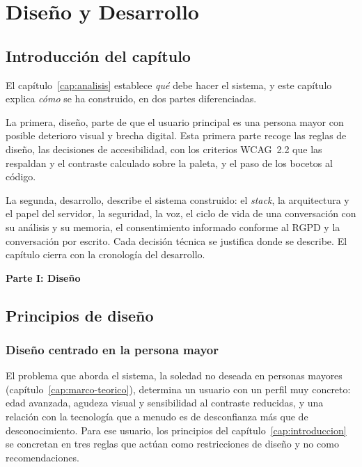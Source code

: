 \chapter{Diseño y Desarrollo}
\label{cap:diseno-desarrollo}

\newcommand{\partesep}[1]{%
  \bigskip
  \begin{center}\hrulefill\quad\textbf{\large #1}\quad\hrulefill\end{center}
  \addcontentsline{toc}{section}{#1}%
  \nopagebreak\medskip}

\section{Introducción del capítulo}

El capítulo~\ref{cap:analisis} establece \emph{qué} debe hacer el sistema, y este capítulo explica \emph{cómo} se ha construido, en dos partes diferenciadas.

La primera, diseño, parte de que el usuario principal es una persona mayor con posible deterioro visual y brecha digital. Esta primera parte recoge las reglas de diseño, las decisiones de accesibilidad, con los criterios WCAG~2.2 que las respaldan y el contraste calculado sobre la paleta, y el paso de los bocetos al código.

La segunda, desarrollo, describe el sistema construido: el \emph{stack}, la arquitectura y el papel del servidor, la seguridad, la voz, el ciclo de vida de una conversación con su análisis y su memoria, el consentimiento informado conforme al RGPD y la conversación por escrito. Cada decisión técnica se justifica donde se describe. El capítulo cierra con la cronología del desarrollo.

\partesep{Parte I: Diseño}

\section{Principios de diseño}

\subsection{Diseño centrado en la persona mayor}

El problema que aborda el sistema, la soledad no deseada en personas mayores (capítulo~\ref{cap:marco-teorico}), determina un usuario con un perfil muy concreto: edad avanzada, agudeza visual y sensibilidad al contraste reducidas, y una relación con la tecnología que a menudo es de desconfianza más que de desconocimiento. Para ese usuario, los principios del capítulo~\ref{cap:introduccion} se concretan en tres reglas que actúan como restricciones de diseño y no como recomendaciones.

